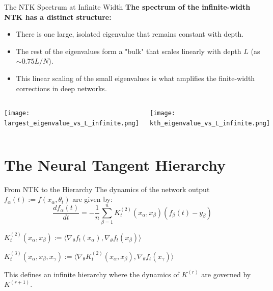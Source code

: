 \documentclass{beamer}
\begin{document}
\begin{frame}{The NTK Spectrum at Infinite Width}
\textbf{The spectrum of the infinite-width NTK has a distinct structure:}
\begin{itemize}
    \item There is one large, isolated eigenvalue that remains constant with depth.
    \item The rest of the eigenvalues form a "bulk" that scales linearly with depth $L$ (as $\sim 0.75 L/N$).
    \item This linear scaling of the small eigenvalues is what amplifies the finite-width corrections in deep networks.
\end{itemize}

\begin{columns}[T] %
    \texttt{[image: largest\_eigenvalue\_vs\_L\_infinite.png]}

    \texttt{[image: kth\_eigenvalue\_vs\_L\_infinite.png]}
\end{columns}

\end{frame}

\section{The Neural Tangent Hierarchy}

\begin{frame}{From NTK to the Hierarchy}
The dynamics of the network output $f_\alpha(t) := f(x_\alpha, \theta_t)$ are given by:
\[
\frac{d f_\alpha(t)}{dt} = -\frac{1}{n} \sum_{\beta=1}^n K^{(2)}_t(x_\alpha, x_\beta) (f_\beta(t) - y_\beta)
\]
\begin{definition}
$K^{(2)}_t(x_\alpha, x_\beta) := \langle \nabla_\theta f_t(x_\alpha), \nabla_\theta f_t(x_\beta) \rangle$
\end{definition}
\vspace{0.5cm}

\begin{definition}
$K^{(3)}_t(x_\alpha, x_\beta, x_\gamma) := \langle \nabla_\theta K^{(2)}_t(x_\alpha, x_\beta), \nabla_\theta f_t(x_\gamma) \rangle$
\end{definition}
This defines an infinite hierarchy where the dynamics of $K^{(r)}$ are governed by $K^{(r+1)}$.
\end{frame}
\end{document}
